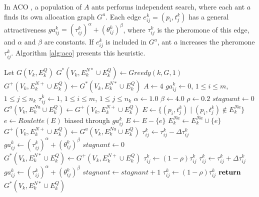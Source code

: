 \documentclass[preprint,authoryear]{elsarticle}
\begin{document}
In ACO \cite{Dorigo1992}, a population of $A$\/ ants performs independent search, where each ant $a$\/ finds its own allocation graph $G^a$. Each edge $e^k_{ij}=(p_i,t^k_j)$\/ has a general attractiveness $ga^k_{ij} = (\tau^k_{ij})^\alpha + (\theta^k_{ij})^\beta$, where $\tau^k_{ij}$\/ is the pheromone of this edge, and $\alpha$\/ and $\beta$\/ are constants. If $e^k_{ij}$\/ is included in $G^a$, ant $a$\/ increases the pheromone $\tau^k_{ij}$. Algorithm \ref{alg:aco} presents this heuristic.

\begin{algorithm}[H] 
	
	\caption{ $SolveNode(ACO, k, G)$ } \label{alg:aco}
	\begin{algorithmic}[1]
		\State Let $G(V_k, E^Q_k)$
		\State $G^*(V_k, E^{N*}_k \cup E^Q_k) \gets Greedy(k, G, 1)$  \label{aco:greedy}
		\State $G^+(V_k, E^{N+}_k \cup E^Q_k) \gets G^*(V_k,E^{N*}_k \cup E^Q_k)$
		\State $A \gets 4$ \label{aco:ants}
		\State $ga^k_{ij}   \gets 0$, $1 \leq i \leq m$, $1 \leq j \leq n_k$  \label{aco:init1}
		\State $\tau^k_{ij} \gets 1$, $1 \leq i \leq m$, $1 \leq j \leq n_k$   \label{aco:init2}
		\State $\alpha    \gets 1.0$ \label{aco:alpha}
		\State $\beta     \gets 4.0$ \label{aco:beta}
		\State $\rho      \gets 0.2$ \label{aco:rho}
		\State $stagnant \gets 0$
		 \label{aco:while}
			 \label{aco:g1}
				\State $G^a(V_k, E^{Na}_k \cup E^Q_k) \gets G^+(V_k, E^{N+}_k \cup E^Q_k)$
				\State $E \gets \{ (p_i,t^k_j) \mid (p_i,t^k_j) \not\in E^{Na}_k \}$
					\State $e \gets Roulette(E)$ biased through $ga^k_{ij}$  \label{aco:roulette}
					\State $E \gets E - \{e\}$		
						\State $ E^{Na}_k \gets E^{Na}_k \cup \{e\} $ \label{aco:ant2}
					\EndIf	
				\EndWhile	
				 \label{aco:gen1}
					\State $G^+(V_k, E^{N+}_k \cup E^Q_k) \gets G^a(V_k, E^{Na}_k \cup E^Q_k)$  \label{aco:gen2}
							\State $\tau^k_{ij} \gets \tau^k_{ij} - \Delta\tau^k_{ij}$ \label{aco:phero1}
							\State $ga^k_{ij} \gets (\tau^k_{ij})^\alpha + (\theta^k_{ij})^\beta$ \label{aco:ga1}
						\EndFor
				\EndIf 
			\EndFor \label{aco:g2}
			 \label{aco:best1}
				\State $stagnant \gets 0$
				\State $G^*(V_k, E^{N*}_k \cup E^Q_k) \gets G^+(V_k, E^{N+}_k \cup E^Q_k)$
					\State $\tau^k_{ij} \gets (1-\rho)\tau^k_{ij}$ \label{aco:rho1}
					\State $\tau^k_{ij} \gets \tau^k_{ij} + \Delta\tau^k_{ij}$ \label{aco:phero2}
					\State $ga^k_{ij} \gets (\tau^k_{ij})^\alpha + (\theta^k_{ij})^\beta$ \label{aco:ga2}
				\EndFor			
			\Else
				\State $stagnant \gets stagnant + 1$ \label{aco:best2}
			\EndIf
				\State $\tau^k_{ij} \gets (1-\rho)\tau^k_{ij}$ \label{aco:rho2}
			\EndFor	
		\EndWhile	
		\State ${\bf return}$ $G^*(V_k, E^{N*}_k \cup E^Q_k)$		
	\end{algorithmic}
\end{algorithm}
	
\end{document}
